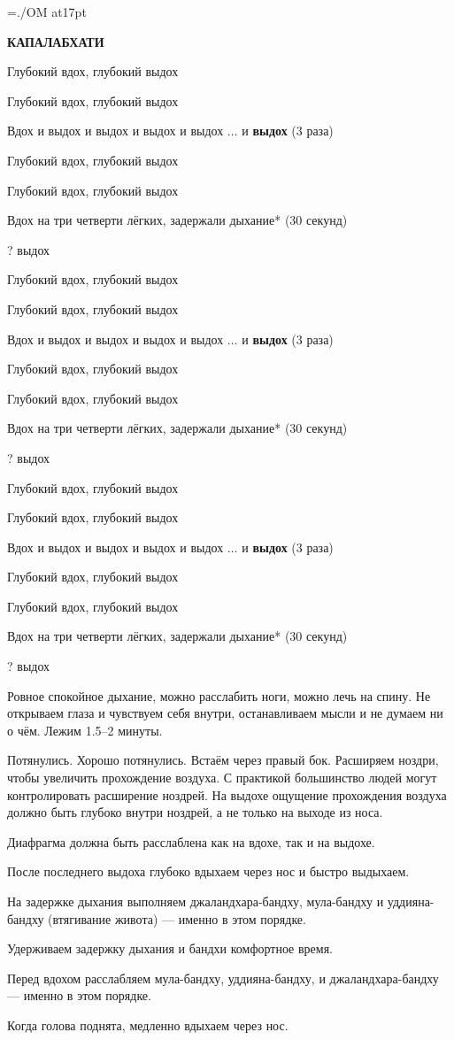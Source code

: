 \pdfhorigin=15mm \hsize=180mm
\pdfvorigin=15mm \vsize=267mm
\nopagenumbers
\font\OM=./OM at17pt
\def\cycle{
  Глубокий вдох, глубокий выдох \par
  Глубокий вдох, глубокий выдох \par
  Вдох и выдох и выдох и выдох и выдох $\ldots$ и {\bf выдох} (3 раза) \par
  Глубокий вдох, глубокий выдох \par
  Глубокий вдох, глубокий выдох \par
  Вдох на три четверти лёгких, задержали дыхание* (30 секунд)\par
  {\OM?} выдох \par}
\parindent=0pt
\parskip=7pt
\centerline{\bf КАПАЛАБХАТИ}
\bigskip
\cycle
\cycle
\cycle
Ровное спокойное дыхание, можно расслабить ноги, можно лечь на спину.
Не открываем глаза и чувствуем себя внутри, останавливаем мысли и не думаем ни о чём.
Лежим 1.5--2 минуты. \par
Потянулись. Хорошо потянулись. Встаём через правый бок.
\vfil\eject
\parskip=0pt
Расширяем ноздри, чтобы увеличить прохождение воздуха. С практикой большинство людей могут
контролировать расширение ноздрей. На выдохе ощущение прохождения воздуха должно быть глубоко
внутри ноздрей, а не только на выходе из носа.

Диафрагма должна быть расслаблена как на вдохе, так и на выдохе.

После последнего выдоха глубоко вдыхаем через нос и быстро выдыхаем.

На задержке дыхания выполняем джаландхара-бандху, мула-бандху и уддияна-бандху
(втягивание живота) --- именно в этом порядке.

Удерживаем задержку дыхания и бандхи комфортное время.

Перед вдохом расслабляем мула-бандху, уддияна-бандху, и джаландха\-ра-бандху --- именно в
этом порядке.

Когда голова поднята, медленно вдыхаем через нос.

\bye

